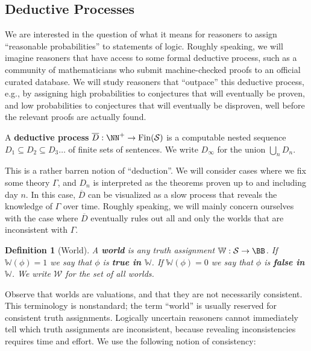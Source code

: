 \documentclass[authordate,onecolumn,noenvironments]{miri-tech-article}
\newtheorem{definition}[theorem]{Definition}
\numberwithin{equation}{subsection}
\newcommand{\fin}{\operatorname{Fin}}
\newcommand{\seq}[1]{{\overline{#1}}}
\newcommand{\nn}{n}
\newcommand{\dt}{D}
\newcommand{\DP}{\seq{\dt}}
\newcommand{\World}{\mathbb{W}}
\newcommand{\Worlds}{\mathcal{W}}
\newcommand{\Theory}{\Gamma}
\newcommand{\Sentences}{\mathcal{S}}
\begin{document}
\subsection{Deductive Processes}\label{sec:worlds}
We are interested in the question of what it means for reasoners to assign ``reasonable probabilities'' to statements of logic. Roughly speaking, we will imagine reasoners that have access to some formal deductive process, such as a community of mathematicians who submit machine-checked proofs to an official curated database. We will study reasoners that ``outpace'' this deductive process, e.g., by assigning high probabilities to conjectures that will eventually be proven, and low probabilities to conjectures that will eventually be disproven, well before the relevant proofs are actually found.

\begin{keydef}\label{def:dedproc}
  A \textbf{deductive process} $\DP : \NN^+ \to \fin(\Sentences)$ is a computable nested sequence $\dt_1 \subseteq \dt_2 \subseteq \dt_3 \ldots$ of finite sets of sentences.  We write $\dt_\infty$ for the union $\bigcup_\nn \dt_\nn$.
\end{keydef}

This is a rather barren notion of ``deduction''. We will consider cases where we fix some theory $\Theory$, and $\dt_\nn$ is interpreted as the theorems proven up to and including day $\nn$. In this case, $\DP$ can be visualized as a slow process that reveals the knowledge of $\Theory$ over time. Roughly speaking, we will mainly concern ourselves with the case where $\DP$ eventually rules out all and only the worlds that are inconsistent with $\Theory$.

\begin{definition}[World]\label{def:world}
  A \textbf{world} is any truth assignment $\World:\Sentences\to\BB$. If $\World(\phi)=1$ we say that $\phi$ is \textbf{true in $\World$}. If $\World(\phi)=0$ we say that $\phi$ is \textbf{false in $\World$}. We write $\Worlds$ for the set of all worlds.
\end{definition}

\noindent Observe that worlds are valuations, and that they are not necessarily consistent. This terminology is nonstandard; the term ``world'' is usually reserved for consistent truth assignments. Logically uncertain reasoners cannot immediately tell which truth assignments are inconsistent, because revealing inconsistencies requires time and effort. We use the following notion of consistency:
\end{document}
